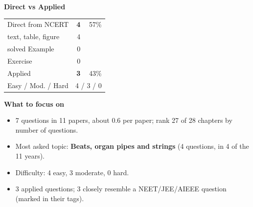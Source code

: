 \begin{minipage}[t]{0.34\linewidth}{\small\textbf{\color{crimson}Direct vs Applied}\par\smallskip
\begin{tabular}{@{}lrr@{}}\toprule
Direct from NCERT & \textbf{4} & 57\%\\
\quad text, table, figure & 4 &\\
\quad solved Example & 0 &\\
\quad Exercise & 0 &\\
Applied & \textbf{3} & 43\%\\\midrule
Easy / Mod. / Hard & \multicolumn{2}{r}{4 / 3 / 0}\\\bottomrule
\end{tabular}}\end{minipage}\hfill
\begin{minipage}[t]{0.63\linewidth}{\small\textbf{\color{crimson}What to focus on}\par\smallskip
\begin{itemize}[leftmargin=1.1em,itemsep=1pt,topsep=0pt]
\item 7 questions in 11 papers, about 0.6 per paper; rank 27 of 28 chapters by number of questions.
\item Most asked topic: \textbf{Beats, organ pipes and strings} (4 questions, in 4 of the 11 years).
\item Difficulty: 4 easy, 3 moderate, 0 hard.
\item 3 applied questions; 3 closely resemble a NEET/JEE/AIEEE question (marked in their tags).
\end{itemize}}\end{minipage}\par
{}
